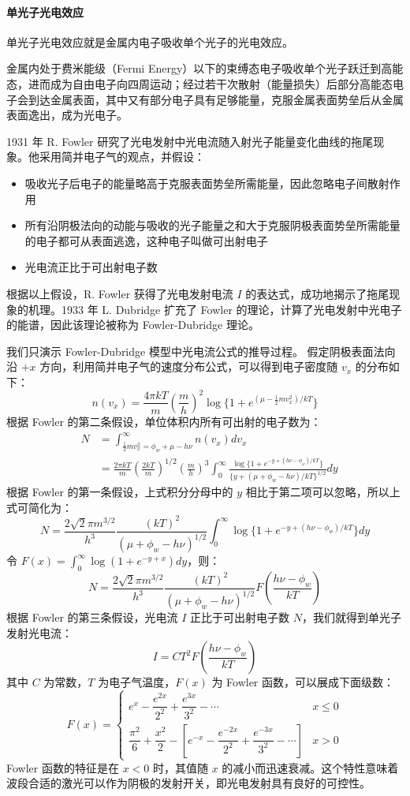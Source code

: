 \paragraph{单光子光电效应}
单光子光电效应就是金属内电子吸收单个光子的光电效应。

金属内处于费米能级（Fermi Energy）以下的束缚态电子吸收单个光子跃迁到高能态，进而成为自由电子向四周运动；经过若干次散射（能量损失）后部分高能态电子会到达金属表面，其中又有部分电子具有足够能量，克服金属表面势垒后从金属表面逸出，成为光电子。

	1931 年 R. Fowler 研究了光电发射中光电流随入射光子能量变化曲线的拖尾现象。他采用简并电子气的观点，并假设：
	\begin{itemize}
	\item 吸收光子后电子的能量略高于克服表面势垒所需能量，因此忽略电子间散射作用
	\item 所有沿阴极法向的动能与吸收的光子能量之和大于克服阴极表面势垒所需能量的电子都可从表面逃逸，这种电子叫做可出射电子
	\item 光电流正比于可出射电子数
	\end{itemize}
	根据以上假设，R. Fowler 获得了光电发射电流 $I$ 的表达式，成功地揭示了拖尾现象的机理。1933 年 L. Dubridge 扩充了 Fowler 的理论，计算了光电发射中光电子的能谱，因此该理论被称为 Fowler-Dubridge 理论。

我们只演示 Fowler-Dubridge 模型中光电流公式的推导过程。
	假定阴极表面法向沿 $+x$ 方向，利用简并电子气的速度分布公式，可以得到电子密度随 $v_x$ 的分布如下：
	\[
	n(v_x) = \frac{4\pi kT}{m}\left(\frac{m}{h}\right)^2\log\{1+e^{(\mu-\frac{1}{2}mv_x^2)/kT}\}
	\]
	根据 Fowler 的第二条假设，单位体积内所有可出射的电子数为：
	\begin{eqnarray*}
	&N &= \int_{\frac{1}{2}mv_x^2=\phi_w+\mu-h\nu}^{\infty}n(v_x)dv_x\\
	&&= \frac{2\pi kT}{m}\left(\frac{2kT}{m}\right)^{1/2}\left(\frac{m}{h}\right)^3\int_0^{\infty}\frac{\log\{1+e^{-y+(h\nu-\phi_w)/kT}\}}{\{y+(\mu+\phi_w-h\nu)/kT\}^{1/2}}dy
	\end{eqnarray*}
	根据 Fowler 的第一条假设，上式积分分母中的 $y$ 相比于第二项可以忽略，所以上式可简化为：
	\[
	N = \frac{2\sqrt{2}\pi m^{3/2}}{h^3}\frac{(kT)^2}{(\mu+\phi_w-h\nu)^{1/2}}\int_0^{\infty}\log\{1+e^{-y+(h\nu-\phi_w)/kT}\}dy
	\]
	令 $F(x) = \int_0^{\infty}\log(1+e^{-y+x})dy$，则：
	\[
	N = \frac{2\sqrt{2}\pi m^{3/2}}{h^3}\frac{(kT)^2}{(\mu+\phi_w-h\nu)^{1/2}}F\left(\frac{h\nu-\phi_w}{kT}\right)
	\]
	根据 Fowler 的第三条假设，光电流 $I$ 正比于可出射电子数 $N$，我们就得到单光子发射光电流：
	\begin{equation}
	I = CT^2F\left(\frac{h\nu-\phi_w}{kT}\right)
	\end{equation}
	其中 $C$ 为常数，$T$ 为电子气温度，$F(x)$ 为 Fowler 函数，可以展成下面级数：
	\[
	F(x) =
	\begin{cases}
	e^x-\dfrac{e^{2x}}{2^2}+\dfrac{e^{3x}}{3^2}-\cdots & x \le 0\\[10pt]
	\dfrac{\pi^2}{6}+\dfrac{x^2}{2}-\left[e^{-x}-\dfrac{e^{-2x}}{2^2}+\dfrac{e^{-3x}}{3^2}-\cdots\right] & x > 0
	\end{cases}
	\]
	Fowler 函数的特征是在 $x < 0$ 时，其值随 $x$ 的减小而迅速衰减。这个特性意味着波段合适的激光可以作为阴极的发射开关，即光电发射具有良好的可控性。

